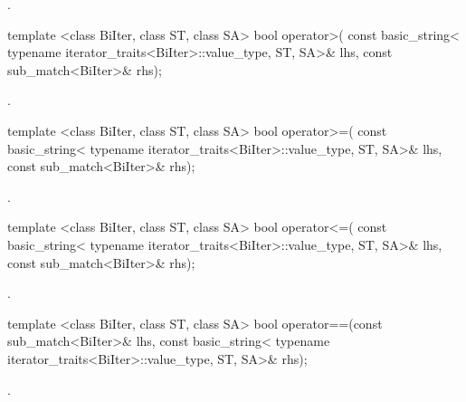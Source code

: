 \begin{itemdescr}
\pnum\returns  {}.
\end{itemdescr}

%
\begin{itemdecl}
template <class BiIter, class ST, class SA>
  bool operator>(
    const basic_string<
      typename iterator_traits<BiIter>::value_type, ST, SA>& lhs,
    const sub_match<BiIter>& rhs);
\end{itemdecl}

\begin{itemdescr}
\pnum\returns  {}.
\end{itemdescr}

%
\begin{itemdecl}
template <class BiIter, class ST, class SA>
  bool operator>=(
    const basic_string<
      typename iterator_traits<BiIter>::value_type, ST, SA>& lhs,
    const sub_match<BiIter>& rhs);
\end{itemdecl}

\begin{itemdescr}
\pnum\returns  {}.
\end{itemdescr}

%
\begin{itemdecl}
template <class BiIter, class ST, class SA>
  bool operator<=(
    const basic_string<
      typename iterator_traits<BiIter>::value_type, ST, SA>& lhs,
    const sub_match<BiIter>& rhs);
\end{itemdecl}

\begin{itemdescr}
\pnum\returns  {}.
\end{itemdescr}

%
\begin{itemdecl}
template <class BiIter, class ST, class SA>
  bool operator==(const sub_match<BiIter>& lhs,
                  const basic_string<
                    typename iterator_traits<BiIter>::value_type, ST, SA>& rhs);
\end{itemdecl}

\begin{itemdescr}
\pnum\returns  {}.
\end{itemdescr}


